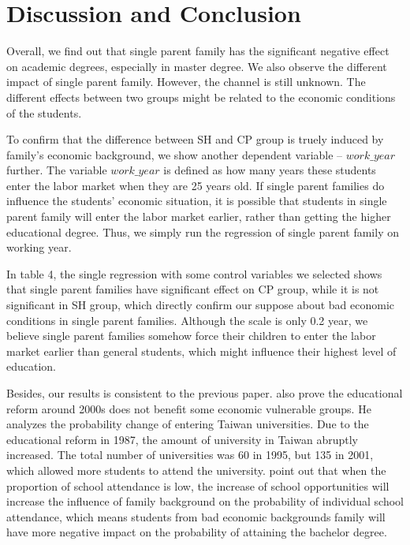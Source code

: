 \documentclass[]{AEA}
\begin{document}
\section{Discussion and Conclusion}

    Overall, we find out that single parent family has the significant negative effect on academic degrees, especially in master degree. We also observe the different impact of single parent family. However, the channel is still unknown. The different effects between two groups might be related to the economic conditions of the students. 

    To confirm that the difference between SH and CP group is truely induced by family's economic background, we show another dependent variable -- $work\_year$ further. The variable $work\_year$ is defined as how many years these students enter the labor market when they are 25 years old. If single parent families do influence the students' economic situation, it is possible that students in single parent family will enter the labor market earlier, rather than getting the higher educational degree. Thus, we simply run the regression of single parent family on working year.

    In table 4, the single regression with some control variables we selected shows that single parent families have significant effect on CP group, while it is not significant in SH group, which directly confirm our suppose about bad economic conditions in single parent families. Although the scale is only 0.2 year, we believe single parent families somehow force their children to enter the labor market earlier than general students, which might influence their highest level of education.

    Besides, our results is consistent to the previous paper.  \citet{Luoh2004}  also prove the educational reform around 2000s does not benefit some economic vulnerable groups. He analyzes the probability change of entering Taiwan universities. Due to the educational reform in 1987, the amount of university in Taiwan abruptly increased. The total number of universities was 60 in 1995, but 135 in 2001, which allowed more students to attend the university.  \citet{Luoh2004} point out that when the proportion of school attendance is low, the increase of school opportunities will increase the influence of family background on the probability of individual school attendance, which means students from bad economic backgrounds family will have more negative impact on the probability of attaining the bachelor degree. 
   
\end{document}
